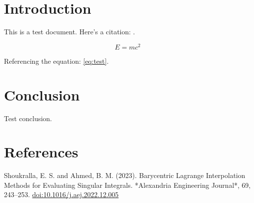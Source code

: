 \documentclass{crebsshr}
\begin{document}

\section{Introduction}\label{introduction}

This is a test document. Here's a citation: \citep{shoukralla:23}.

\begin{equation} \label{eq:test}
E = mc^2
\end{equation}

Referencing the equation: \eqref{eq:test}.

\section{Conclusion}\label{conclusion}

Test conclusion.

\section{References}\label{references}

\begin{thebibliography}{99}

Shoukralla, E. S. and Ahmed, B. M. (2023). Barycentric Lagrange Interpolation Methods for Evaluating Singular Integrals. *Alexandria Engineering Journal*, 69, 243–253. \href{https://doi.org/10.1016/j.aej.2022.12.005}{doi:10.1016/j.aej.2022.12.005}

\end{thebibliography}



\end{document}
